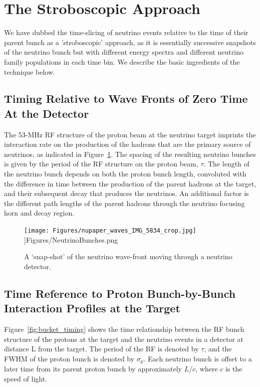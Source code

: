 %
%
\section{The Stroboscopic Approach}
\label{approach}
We have dubbed the time-slicing of neutrino events relative to the
time of their parent bunch as a 'stroboscopic' approach, as it is
essentially successive snapshots of the neutrino bunch but with
different energy spectra and different neutrino family populations in
each time bin. We describe the basic ingredients of the technique
below.

\subsection{Timing Relative to Wave Fronts of Zero Time At the Detector}
\label{wave_front}

The 53-MHz RF structure of the proton beam at the neutrino target imprints
the interaction rate on the production of the hadrons that are the
primary source of neutrinos, as indicated in
Figure~\ref{fig:wave_fronts}. The spacing of the resulting neutrino bunches is given by the
period of the RF structure on the proton beam, $\tau$. The length of
the neutrino bunch depends on both the proton bunch length, convoluted with the difference in time between the
production of the parent hadrons  at the target, and their subsequent
decay that produces the neutrinos. An additional factor is the
different path lengths of the parent hadrons through the neutrino
focusing horn and decay region. 

\begin{figure}[ht]
	\begin{center}
           	\texttt{[image: Figures/nupaper\_waves\_IMG\_5834\_crop.jpg]}
           	   \linewidth]{Figures/NeutrinoBunches.png}
	\end{center}
	\caption{A `snap-shot' of the neutrino wave-front moving
          through a neutrino detector.}

	\label{fig:wave_fronts}
\end{figure}



\subsection{Time Reference to Proton Bunch-by-Bunch Interaction
  Profiles at the Target}
\label{time_reference}

Figure~\ref{fig:bucket_timing} shows the time relationship between the
RF bunch structure of the protons at the target and the neutrino events in a
detector at distance L from the target. The period of the RF is
denoted by $\tau$, and the FWHM of the proton bunch is denoted by
$\sigma_p$. Each neutrino bunch is offset to a later time from its
parent proton bunch by approximately $L/c$, where $c$ is the speed of
light.

